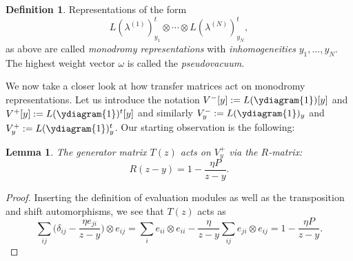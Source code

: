 \documentclass[11pt]{report}
\newtheorem{lemma}[theorem]{Lemma}
\theoremstyle{definition}
\newtheorem{definition}[theorem]{Definition}
\theoremstyle{remark}
\theoremstyle{remark}
\begin{document}
\begin{definition}
Representations of the form
\begin{equation*}
L(\lambda^{(1)})_{y_1}^t \otimes \cdots \otimes L(\lambda^{(N)})_{y_N}^t,
\end{equation*}
as above are called \emph{monodromy representations} with \emph{inhomogeneities} $y_1,...,y_N$. The highest weight vector $\omega$ is called the \emph{pseudovacuum}.
\end{definition}

We now take a closer look at how transfer matrices act on monodromy representations. Let us introduce the notation $V^-[y] := L(\ydiagram{1})[y]$ and $V^+[y] := L(\ydiagram{1})^t[y]$ and similarly $V_y^- := L(\ydiagram{1})_y$ and $V_y^+ := L(\ydiagram{1})_y^t$. Our starting observation is the following:

\begin{lemma}
The generator matrix $T(z)$ acts on $V_y^+$ via the $R$-matrix:
\begin{equation*}
R(z-y) = 1 - \frac{\eta P}{z-y}.
\end{equation*}
\end{lemma}

\begin{proof}
Inserting the definition of evaluation modules as well as the transposition and shift automorphisms, we see that $T(z)$ acts as
\begin{equation*}
\sum_{ij} \bigg( \delta_{ij} - \frac{\eta e_{ji}}{z-y} \bigg) \otimes e_{ij}
= \sum_{i} e_{ii} \otimes e_{ii} - \frac{\eta}{z-y} \sum_{ij} e_{ji} \otimes e_{ij} = 1 - \frac{\eta P}{z-y}.
\end{equation*}
\end{proof}
\end{document}
